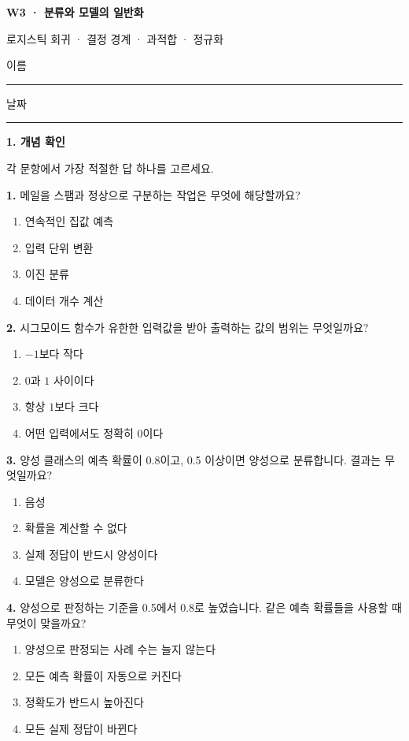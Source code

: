 \documentclass[11pt,a4paper]{article}
\newcommand{\parttitle}[2]{{\large\bfseries\color{ink} #1}\par{\small #2}\par\vspace{5mm}}
\newcommand{\question}[2]{\textbf{#1.} #2\par}
\begin{document}
{\LARGE\bfseries\color{ink} W3 · 분류와 모델의 일반화}\par
{\small 로지스틱 회귀 · 결정 경계 · 과적합 · 정규화}\par
\vspace{3mm}이름\enspace\rule{43mm}{0.3pt}\hfill 날짜\enspace\rule{35mm}{0.3pt}\par\vspace{3mm}
\parttitle{1. 개념 확인}{각 문항에서 가장 적절한 답 하나를 고르세요.}
\question{1}{메일을 스팸과 정상으로 구분하는 작업은 무엇에 해당할까요?}
\begin{enumerate}[label=(\arabic*),leftmargin=9mm,itemsep=0pt,topsep=2pt,parsep=0pt]
\item 연속적인 집값 예측
\item 입력 단위 변환
\item 이진 분류
\item 데이터 개수 계산
\end{enumerate}\vfill
\question{2}{시그모이드 함수가 유한한 입력값을 받아 출력하는 값의 범위는 무엇일까요?}
\begin{enumerate}[label=(\arabic*),leftmargin=9mm,itemsep=0pt,topsep=2pt,parsep=0pt]
\item $-1$보다 작다
\item $0$과 $1$ 사이이다
\item 항상 $1$보다 크다
\item 어떤 입력에서도 정확히 $0$이다
\end{enumerate}\vfill
\question{3}{양성 클래스의 예측 확률이 0.8이고, 0.5 이상이면 양성으로 분류합니다. 결과는 무엇일까요?}
\begin{enumerate}[label=(\arabic*),leftmargin=9mm,itemsep=0pt,topsep=2pt,parsep=0pt]
\item 음성
\item 확률을 계산할 수 없다
\item 실제 정답이 반드시 양성이다
\item 모델은 양성으로 분류한다
\end{enumerate}\vfill
\question{4}{양성으로 판정하는 기준을 0.5에서 0.8로 높였습니다. 같은 예측 확률들을 사용할 때 무엇이 맞을까요?}
\begin{enumerate}[label=(\arabic*),leftmargin=9mm,itemsep=0pt,topsep=2pt,parsep=0pt]
\item 양성으로 판정되는 사례 수는 늘지 않는다
\item 모든 예측 확률이 자동으로 커진다
\item 정확도가 반드시 높아진다
\item 모든 실제 정답이 바뀐다
\end{enumerate}\vfill
\end{document}
